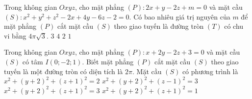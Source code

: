 \begin{ex}%
	Trong không gian $Oxyz$, cho mặt phẳng $(P):2x+y-2z+m=0$ và mặt cầu $(S):x^2+y^2+z^2-2x+4y-6z-2=0$. Có bao nhiêu giá trị nguyên của  $m$ để mặt phẳng $(P)$ cắt mặt cầu $(S)$ theo giao tuyến là đường tròn $(T)$ có chu vi bằng $4\pi \sqrt{3}$. 
	\choice
	{$3$}
	{$4$}
	{\True $2$}
	{$1$}
\end{ex}
\begin{ex}%
	Trong không gian $Oxyz$, cho mặt phẳng $(P)\colon x+2y-2z+3=0$ và mặt cầu $(S)$ có tâm $I(0;-2;1)$. Biết mặt phẳng $(P)$ cắt mặt cầu $(S)$ theo giao tuyến là một đường tròn có diện tích là $2\pi $. Mặt cầu $(S)$ có phương trình là
	\choice
	{$x^2+(y+2)^2+(z+1)^2=2$}
	{\True $x^2+(y+2)^2+(z-1)^2=3$}
	{$x^2+(y+2)^2+(z+1)^2=3$}
	{$x^2+(y+2)^2+(z+1)^2=1$}
\end{ex}
